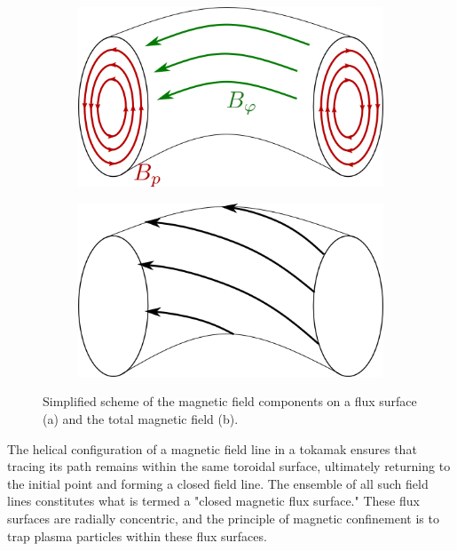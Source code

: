 \begin{figure}[H]
	\centering
	\begin{subfigure}[b]{0.4\textwidth}
		\centering
		\includegraphics[width=1.\textwidth]{schemes/BpolBtor.png}
		\label{fig:TokamakBasics_BpolBtor}
	\end{subfigure}
	\begin{subfigure}[b]{0.4\textwidth}
		\centering
		\includegraphics[width=1.\textwidth]{schemes/Btot.png}
		\label{fig:TokamakBasics_Btot}
	\end{subfigure}
	\caption{Simplified scheme of the magnetic field components on a flux surface (a) and the total magnetic field (b).}
	\label{fig:1_magneticConfigurationTorus}
\end{figure}

The helical configuration of a magnetic field line in a tokamak ensures that tracing its path remains within the same toroidal surface, ultimately returning to the initial point and forming a closed field line. The ensemble of all such field lines constitutes what is termed a "closed magnetic flux surface." These flux surfaces are radially concentric, and the principle of magnetic confinement is to trap plasma particles within these flux surfaces.\newline

